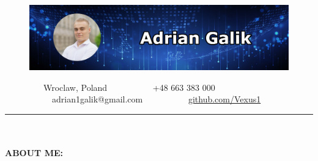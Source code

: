 \documentclass[10pt]{article}
\newcommand{\longline}{\rule{19.6cm}{1pt}}
\begin{document}
\begin{figure}[t]
    \hskip-1.55cm\includegraphics[scale=1.3625]{Galik_BANNER.png}
\end{figure}

\vspace*{-4ex}

\ \ \ \ \ \ \ \ \
\faMapMarker* Wroclaw, Poland \ \ \ \ \ \ \ \ \ \
\faPhone +48 663 383 000 \ \ \ \ \ \ \ \ \ \
\faEnvelope \ adrian1galik@gmail.com \ \ \ \ \ \ \ \ \ \
\faGithub \href{https://github.com/Vexus1}{github.com/Vexus1}


\noindent \longline 
\\ \\
\noindent \fontsize{14pt}{14pt}\selectfont \textbf{\color{Violet}ABOUT ME:}
\fontsize{10pt}{10pt}\selectfont
\end{document}
